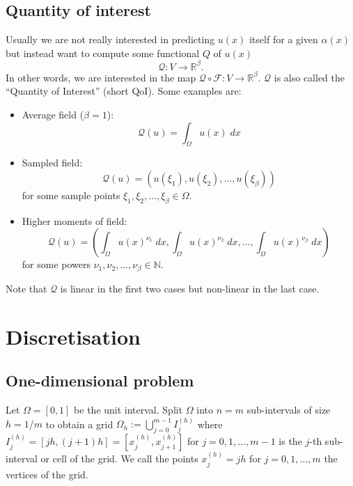 \documentclass[11pt]{article}
\begin{document}
\subsection{Quantity of interest}
Usually we are not really interested in predicting $u(x)$ itself for a given $\alpha(x)$ but instead want to compute some functional $Q$ of $u(x)$
\begin{equation}
    \mathcal{Q}: V\rightarrow \mathbb{R}^\beta.\label{eqn:QoI}
\end{equation}
In other words, we are interested in the map $\mathcal{Q}\circ \mathcal{F}:V\rightarrow \mathbb{R}^\beta$. $\mathcal{Q}$ is also called the ``Quantity of Interest'' (short QoI). Some examples are:
\begin{itemize}
    \item Average field ($\beta=1$):
    \begin{equation}
        \mathcal{Q}(u) = \int_\Omega u(x)\;dx
    \end{equation}
    \item Sampled field:
    \begin{equation}
        \mathcal{Q}(u) = (u(\xi_1),u(\xi_2),\dots,u(\xi_\beta))
    \end{equation}
     for some sample points $\xi_1,\xi_2,\dots,\xi_\beta\in\Omega$.
    \item Higher moments of field:
    \begin{equation}
        \mathcal{Q}(u) = \left(\int_\Omega u(x)^{\nu_1}\;dx,\int_\Omega u(x)^{\nu_2}\;dx,\dots,\int_\Omega u(x)^{\nu_\beta}\;dx\right)
    \end{equation}
    for some powers $\nu_1,\nu_2,\dots,\nu_\beta\in\mathbb{N}$.
\end{itemize}
Note that $\mathcal{Q}$ is linear in the first two cases but non-linear in the last case.
\section{Discretisation}
\subsection{One-dimensional problem}
Let $\Omega = [0,1]$ be the unit interval. Split $\Omega$ into $n=m$ sub-intervals of size $h=1/m$ to obtain a grid \mbox{$\Omega_h := \bigcup_{j=0}^{m-1} I_j^{(h)}$} where $I_j^{(h)}=[jh,(j+1)h]=[x^{(h)}_j,x^{(h)}_{j+1}]$ for $j=0,1,\dots,m-1$ is the $j$-th sub-interval or cell of the grid. We call the points $x^{(h)}_j=jh$ for $j=0,1,\dots,m$ the vertices of the grid.
\end{document}
